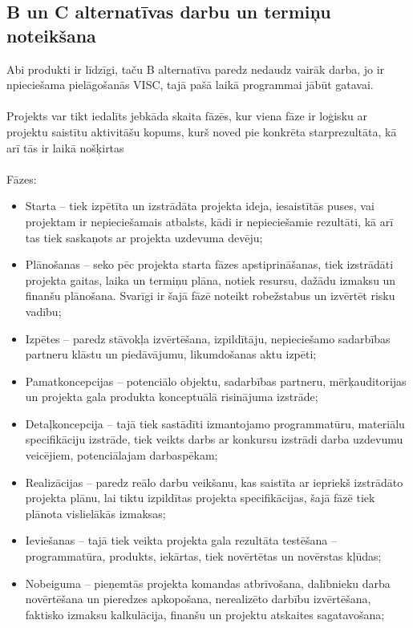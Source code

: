 \subsection{B un C alternatīvas darbu un termiņu noteikšana}
Abi produkti ir līdzīgi, taču B alternatīva paredz nedaudz vairāk darba, jo ir npieciešama pielāgošanās VISC, tajā pašā
laikā programmai jābūt gatavai.
\paragraph{}
Projekts var tikt iedalīts jebkāda skaita fāzēs, kur viena fāze ir
loģisku ar projektu saistītu aktivitāšu kopums, kurš noved pie konkrēta starprezultāta, kā arī tās ir
laikā nošķirtas %
\paragraph{}
Fāzes:
\begin{itemize}
    \item Starta – tiek izpētīta un izstrādāta projekta ideja, iesaistītās puses, vai projektam ir
    nepieciešamais atbalsts, kādi ir nepieciešamie rezultāti, kā arī tas tiek saskaņots ar projekta
    uzdevuma devēju;
    \item Plānošanas – seko pēc projekta starta fāzes apstiprināšanas, tiek izstrādāti projekta
    gaitas, laika un termiņu plāna, notiek resursu, dažādu izmaksu un finanšu plānošana. Svarīgi
    ir šajā fāzē noteikt robežstabus un izvērtēt risku vadību;
    \item Izpētes – paredz stāvokļa izvērtēšana, izpildītāju, nepieciešamo sadarbības partneru
    klāstu un piedāvājumu, likumdošanas aktu izpēti;
    \item Pamatkoncepcijas – potenciālo objektu, sadarbības partneru, mērķauditorijas un
    projekta gala produkta konceptuālā risinājuma izstrāde;
    \item Detaļkoncepcija – tajā tiek sastādīti izmantojamo programmatūru, materiālu specifikāciju
    izstrāde, tiek veikts darbs ar konkursu izstrādi darba uzdevumu veicējiem, potenciālajam
    darbaspēkam;
    \item Realizācijas – paredz reālo darbu veikšanu, kas saistīta ar iepriekš izstrādāto projekta
    plānu, lai tiktu izpildītas projekta specifikācijas, šajā fāzē tiek plānota vislielākās izmaksas;
    \item Ieviešanas – tajā tiek veikta projekta gala rezultāta testēšana – programmatūra,
    produkts, iekārtas, tiek novērtētas un novērstas kļūdas;
    \item Nobeiguma – pieņemtās projekta komandas atbrīvošana, dalībnieku darba novērtēšana
    un pieredzes apkopošana, nerealizēto darbību izvērtēšana, faktisko izmaksu kalkulācija,
    finanšu un projektu atskaites sagatavošana;
\end{itemize}
